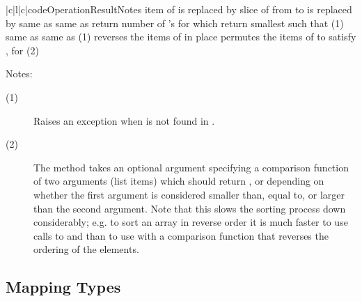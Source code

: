 \begin{tableiii}{|c|l|c|}{code}{Operation}{Result}{Notes}
	{item  of  is replaced by }{}
  	{slice of  from  to  is replaced by }{}
	{same as }{}
	{same as }{}
	{return number of 's for which }{}
	{return smallest  such that }{(1)}
	{same as }{}
	{same as }{(1)}
	{reverses the items of  in place}{}
	{permutes the items of  to satisfy
        ,
        for }{(2)}
\end{tableiii}
\renewcommand{\indexsubitem}{(list method)}

\noindent
Notes:
\begin{description}
\item[(1)] Raises an exception when  is not found in .
  
\item[(2)] The  method takes an optional argument
  specifying a comparison function of two arguments (list items) which
  should return ,  or  depending on whether the
  first argument is considered smaller than, equal to, or larger than the
  second argument.  Note that this slows the sorting process down
  considerably; e.g. to sort an array in reverse order it is much faster
  to use calls to  and  than to use
   with a comparison function that reverses the ordering of
  the elements.
\end{description}

\subsection{Mapping Types}

